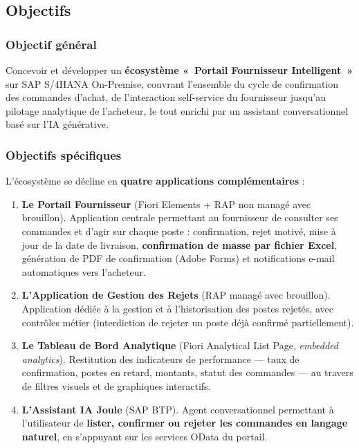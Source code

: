 \documentclass[12pt,a4paper,oneside]{report}
\begin{document}
\subsection{Objectifs}\label{ch1:objectifs-projet}

\setcounter{secnumdepth}{3}
\subsubsection{Objectif général}\label{ch1:obj-general}

Concevoir et développer un \textbf{écosystème «~Portail Fournisseur Intelligent~»}
sur SAP S/4HANA On-Premise, couvrant l'ensemble du cycle de confirmation des commandes
d'achat, de l'interaction self-service du fournisseur jusqu'au pilotage analytique de
l'acheteur, le tout enrichi par un assistant conversationnel basé sur l'IA générative.

\subsubsection{Objectifs spécifiques}\label{ch1:obj-specifiques}

L'écosystème se décline en \textbf{quatre applications complémentaires} :

\begin{enumerate}[itemsep=0.35em, leftmargin=1.6em]
	\item \textbf{Le Portail Fournisseur} (Fiori Elements + RAP non managé avec
	      brouillon). Application centrale permettant au fournisseur de consulter ses
	      commandes et d'agir sur chaque poste : confirmation, rejet motivé, mise à
	      jour de la date de livraison, \textbf{confirmation de masse par fichier
	      Excel}, génération de PDF de confirmation (Adobe Forms) et notifications
	      e-mail automatiques vers l'acheteur.
	\item \textbf{L'Application de Gestion des Rejets} (RAP managé avec brouillon).
	      Application dédiée à la gestion et à l'historisation des postes rejetés, avec
	      contrôles métier (interdiction de rejeter un poste déjà confirmé
	      partiellement).
	\item \textbf{Le Tableau de Bord Analytique} (Fiori Analytical List Page,
	      \textit{embedded analytics}). Restitution des indicateurs de performance ---
	      taux de confirmation, postes en retard, montants, statut des commandes ---
	      au travers de filtres visuels et de graphiques interactifs.
	\item \textbf{L'Assistant IA Joule} (SAP BTP). Agent conversationnel permettant à
	      l'utilisateur de \textbf{lister, confirmer ou rejeter les commandes en
	      langage naturel}, en s'appuyant sur les services OData du portail.
\end{enumerate}
\end{document}
